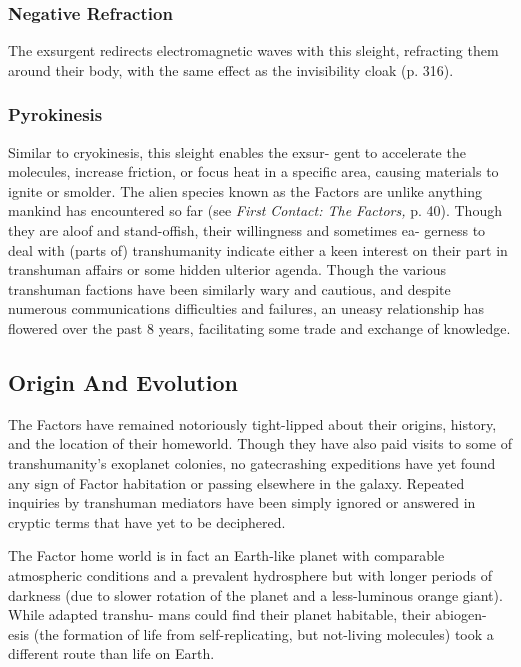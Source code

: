 \subsubsection{Negative Refraction}

The exsurgent redirects electromagnetic waves with 
this sleight, refracting them around their body, with 
the same effect as the invisibility cloak (p. 316).

\subsubsection{Pyrokinesis}

Similar to cryokinesis, this sleight enables the exsur-
gent to accelerate the molecules, increase friction, or 
focus heat in a specific area, causing materials to ignite 
or smolder.
The alien species known as the Factors are unlike 
anything mankind has encountered so far (see \textit{First }
\textit{Contact: The Factors,} p. 40). Though they are aloof 
and stand-offish, their willingness and sometimes ea-
gerness to deal with (parts of) transhumanity indicate 
either a keen interest on their part in transhuman 
affairs or some hidden ulterior agenda. Though the 
various transhuman factions have been similarly wary 
and cautious, and despite numerous communications 
difficulties and failures, an uneasy relationship has 
flowered over the past 8 years, facilitating some trade 
and exchange of knowledge.

\subsection{Origin And Evolution }

The Factors have remained notoriously tight-lipped 
about their origins, history, and the location of their 
homeworld. Though they have also paid visits to some 
of transhumanity's exoplanet colonies, no gatecrashing 
expeditions have yet found any sign of Factor habitation 
or passing elsewhere in the galaxy. Repeated inquiries 
by transhuman mediators have been simply ignored or 
answered in cryptic terms that have yet to be deciphered.

The Factor home world is in fact an Earth-like 
planet with comparable atmospheric conditions and 
a prevalent hydrosphere but with longer periods of 
darkness (due to slower rotation of the planet and a 
less-luminous orange giant). While adapted transhu-
mans could find their planet habitable, their abiogen-
esis (the formation of life from self-replicating, but 
not-living molecules) took a different route than life 
on Earth. 

